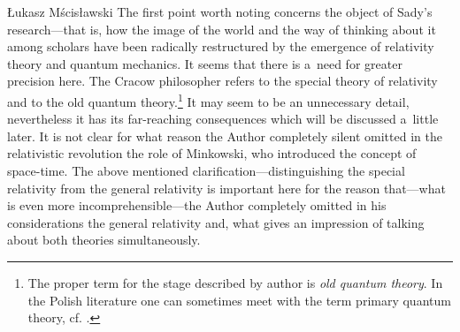 \begin{newrevengenv}{Łukasz Mścisławski}
The first point worth noting concerns the object of Sady's research---that is, how the image of the world and the way of thinking about it among scholars have been radically restructured by the emergence of relativity theory and quantum mechanics. It seems that there is a~need for greater precision here. The Cracow philosopher refers to the special theory of relativity and to the old quantum theory.\footnote{The proper term for the stage described by author is \textit{old quantum theory}. In the Polish literature one can sometimes meet with the term primary quantum theory, cf.
\parencite[][p.3]{sredniawa_mechanika_1981}.%
} It may seem to be an unnecessary detail, nevertheless it has its far-reaching consequences which will be discussed a~little later. It is not clear for what reason the Author completely silent omitted in the relativistic revolution the role of Minkowski, who introduced the concept of space-time. The above mentioned clarification---distinguishing the special relativity from the general relativity is important here for the reason that---what is even more incomprehensible---the Author completely omitted in his considerations the general relativity and, what gives an impression of talking about both theories simultaneously.


\end{newrevengenv}
